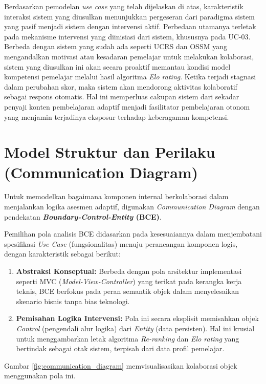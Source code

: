 Berdasarkan pemodelan \textit{use case} yang telah dijelaskan di atas, karakteristik interaksi sistem yang
diusulkan menunjukkan pergeseran dari paradigma sistem yang pasif menjadi sistem dengan intervensi aktif.
Perbedaan utamanya terletak pada mekanisme intervensi yang diinisiasi dari sistem, khususnya pada UC-03.
Berbeda dengan sistem yang sudah ada seperti UCRS dan OSSM yang mengandalkan motivasi atau kesadaran pemelajar untuk
melakukan kolaborasi, sistem yang diusulkan ini akan secara proaktif memantau kondisi model kompetensi pemelajar
melalui hasil algoritma \textit{Elo rating}. Ketika terjadi stagnasi dalam perubahan skor, maka sistem akan mendorong
aktivitas kolaboratif sebagai respons otomatis. Hal ini memperluas cakupan sistem dari sekadar penyaji konten
pembelajaran adaptif menjadi fasilitator pembelajaran otonom yang menjamin terjadinya eksposur terhadap keberagaman kompetensi.

\section{Model Struktur dan Perilaku (Communication Diagram)}
\label{sec:structure_behavior_model}

Untuk memodelkan bagaimana komponen internal berkolaborasi dalam menjalankan logika asesmen adaptif, digunakan \textit{Communication Diagram} dengan pendekatan \textbf{\textit{Boundary-Control-Entity} (BCE)}.

Pemilihan pola analisis BCE didasarkan pada kesesuaiannya dalam menjembatani spesifikasi \textit{Use Case} (fungsionalitas) menuju perancangan komponen logis, dengan karakteristik sebagai berikut:
\begin{enumerate}
    \item \textbf{Abstraksi Konseptual:} Berbeda dengan pola arsitektur implementasi seperti MVC (\textit{Model-View-Controller}) yang terikat pada kerangka kerja teknis, BCE berfokus pada peran semantik objek dalam menyelesaikan skenario bisnis tanpa bias teknologi.
    \item \textbf{Pemisahan Logika Intervensi:} Pola ini secara eksplisit memisahkan objek \textit{Control} (pengendali alur logika) dari \textit{Entity} (data persisten). Hal ini krusial untuk menggambarkan letak algoritma \textit{Re-ranking} dan \textit{Elo rating} yang bertindak sebagai otak sistem, terpisah dari data profil pemelajar.
\end{enumerate}

Gambar \ref{fig:communication_diagram} memvisualisasikan kolaborasi objek menggunakan pola ini.

